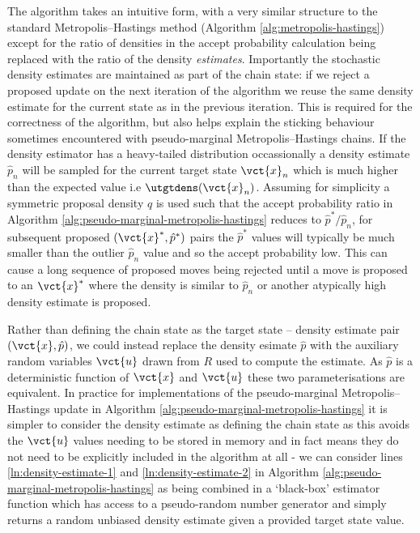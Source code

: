 The algorithm takes an intuitive form, with a very similar structure to the standard Metropolis--Hastings method (Algorithm \ref{alg:metropolis-hastings}) except for the ratio of densities in the accept probability calculation being replaced with the ratio of the density \emph{estimates}. Importantly the stochastic density estimates are maintained as part of the chain state: if we reject a proposed update on the next iteration of the algorithm we reuse the same density estimate for the current state as in the previous iteration. This is required for the correctness of the algorithm, but also helps explain the sticking behaviour sometimes encountered with pseudo-marginal Metropolis--Hastings chains. If the density estimator has a heavy-tailed distribution occassionally a density estimate $\hat{p}_n$ will be sampled for the current target state $\vct{x}_n$ which is much higher than the expected value i.e $\utgtdens(\vct{x}_n)$. Assuming for simplicity a symmetric proposal density $q$ is used such that the accept probability ratio in Algorithm \ref{alg:pseudo-marginal-metropolis-hastings} reduces to $\hat{p}^* / \hat{p}_n$, for subsequent proposed $(\vct{x}^*,\hat{p}^*)$ pairs the $\hat{p}^*$ values will typically be much smaller than the outlier $\hat{p}_n$ value and so the accept probability low. This can cause a long sequence of proposed moves being rejected until a move is proposed to an $\vct{x}^*$ where the density is similar to $\hat{p}_n$ or another atypically high density estimate is proposed.

Rather than defining the chain state as the target state -- density estimate pair $(\vct{x},\hat{p})$, we could instead replace the density esimate $\hat{p}$ with the auxiliary random variables $\vct{u}$ drawn from $R$ used to compute the estimate. As $\hat{p}$ is a deterministic function of $\vct{x}$ and $\vct{u}$ these two parameterisations are equivalent. In practice for implementations of the pseudo-marginal Metropolis--Hastings update in Algorithm \ref{alg:pseudo-marginal-metropolis-hastings} it is simpler to consider the density estimate as defining the chain state as this avoids the $\vct{u}$ values needing to be stored in memory and in fact means they do not need to be explicitly included in the algorithm at all - we can consider lines \ref{ln:density-estimate-1} and \ref{ln:density-estimate-2} in Algorithm \ref{alg:pseudo-marginal-metropolis-hastings} as being combined in a `black-box' estimator function which has access to a pseudo-random number generator and simply returns a random unbiased density estimate given a provided target state value.


